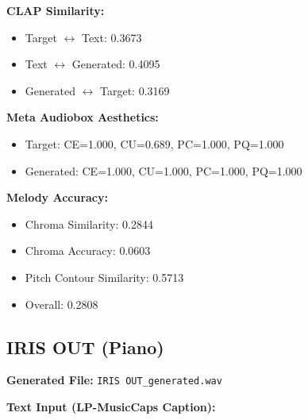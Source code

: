 \documentclass{article}
\begin{document}
\textbf{CLAP Similarity:}
\begin{itemize}
    \item Target $\leftrightarrow$ Text: 0.3673
    \item Text $\leftrightarrow$ Generated: 0.4095
    \item Generated $\leftrightarrow$ Target: 0.3169
\end{itemize}

\textbf{Meta Audiobox Aesthetics:}
\begin{itemize}
    \item Target: CE=1.000, CU=0.689, PC=1.000, PQ=1.000
    \item Generated: CE=1.000, CU=1.000, PC=1.000, PQ=1.000
\end{itemize}

\textbf{Melody Accuracy:}
\begin{itemize}
    \item Chroma Similarity: 0.2844
    \item Chroma Accuracy: 0.0603
    \item Pitch Contour Similarity: 0.5713
    \item Overall: 0.2808
\end{itemize}

\subsection{IRIS OUT (Piano)}

\textbf{Generated File:} \texttt{IRIS OUT\_generated.wav}

\textbf{Text Input (LP-MusicCaps Caption):}
\end{document}
